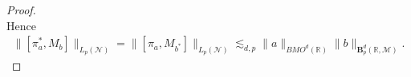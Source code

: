 \documentclass[oneside,english,a4wide]{amsart}
\numberwithin{equation}{section}
\numberwithin{figure}{section}
\theoremstyle{plain}
\theoremstyle{plain}
\theoremstyle{definition}
\theoremstyle{plain}
\theoremstyle{remark}
\theoremstyle{definition}
\theoremstyle{remark}
\theoremstyle{definition}
\newcommand{\8}{\infty}
\begin{document}
\begin{proof}
\begin{equation*}
		\end{equation*}
Hence
\begin{equation*}
\begin{aligned}
	\|[\pi_a^*,M_b]\|_{L_p(\mathcal{N})}=\|[\pi_a,M_{b^*}]\|_{L_p(\mathcal{N})}\lesssim_{d,p} \|a\|_{BMO^d(\mathbb{R})}\|b\|_{\pmb{B}_p^{d}(\mathbb{R},\mathcal{M})}.
\end{aligned}
\end{equation*}
	\end{proof}
\end{document}
